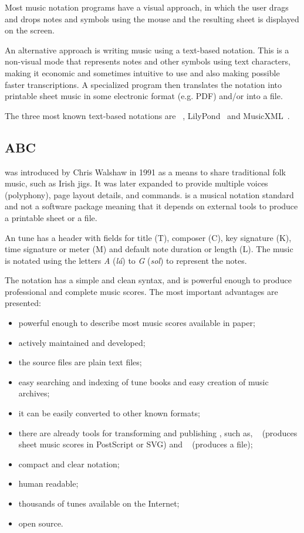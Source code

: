 Most music notation programs have a visual approach, in which the user drags and drops notes and
symbols using the mouse and the resulting sheet is displayed on the screen.

An alternative approach is writing music using a text-based notation. This is a non-visual mode that
represents notes and other symbols using text characters, making it economic and sometimes intuitive
to use and also making possible faster transcriptions. A specialized program then translates the
notation into printable sheet music in some electronic format (e.g. PDF) and/or into a \midi{} file.

The three most known text-based notations are \abc{}~\cite{abcnotation:Online},
LilyPond~\cite{lilypond:Online} and MusicXML~\cite{musicxml:Online}.

\subsection{ABC}

\abc{} was introduced by Chris Walshaw in 1991 as a means to share traditional folk music, such as
Irish jigs. It was later expanded to provide multiple voices (polyphony), page layout details, and
\midi{} commands. \abc{} is a musical notation standard and not a software package meaning that it
depends on external tools to produce a printable sheet or a \midi{} file.

An \abc{} tune has a header with fields for title (T), composer (C), key signature (K), time
signature or meter (M) and default note duration or length (L). The music is notated using the
letters \emph{A} (\textit{lá}) to \emph{G} (\textit{sol}) to represent the notes.

The notation has a simple and clean syntax, and is powerful enough to produce professional and
complete music scores. The most important advantages are presented:

\begin{itemize}
  \item powerful enough to describe most music scores available in paper;
  \item actively maintained and developed;
  \item the source files are plain text files;
  \item easy searching and indexing of tune books and easy creation of music archives;
  \item it can be easily converted to other known formats;
  \item there are already tools for transforming and publishing \abc{}, such as,
    \abcmtops{}~\cite{abcm2ps:Online} (produces sheet music scores in PostScript or SVG) and
    \abctomidi{}~\cite{abc2midi:Online} (produces a \midi{} file);
  \item compact and clear notation;
  \item human readable;
  \item thousands of tunes available on the Internet;
  \item open source.
\end{itemize}

